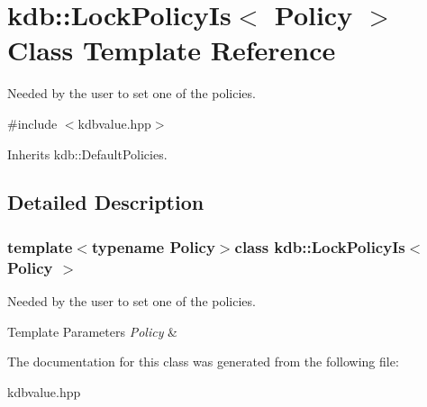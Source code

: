 \hypertarget{classkdb_1_1LockPolicyIs}{\section{kdb\-:\-:Lock\-Policy\-Is$<$ Policy $>$ Class Template Reference}
\label{classkdb_1_1LockPolicyIs}
}


Needed by the user to set one of the policies.  




{\ttfamily \#include $<$kdbvalue.\-hpp$>$}



Inherits kdb\-::\-Default\-Policies.



\subsection{Detailed Description}
\subsubsection*{template$<$typename Policy$>$class kdb\-::\-Lock\-Policy\-Is$<$ Policy $>$}

Needed by the user to set one of the policies. 


\begin{DoxyTemplParams}{Template Parameters}
{\em Policy} & \\
\hline
\end{DoxyTemplParams}


The documentation for this class was generated from the following file\-:\begin{DoxyCompactItemize}
\item 
kdbvalue.\-hpp\end{DoxyCompactItemize}
